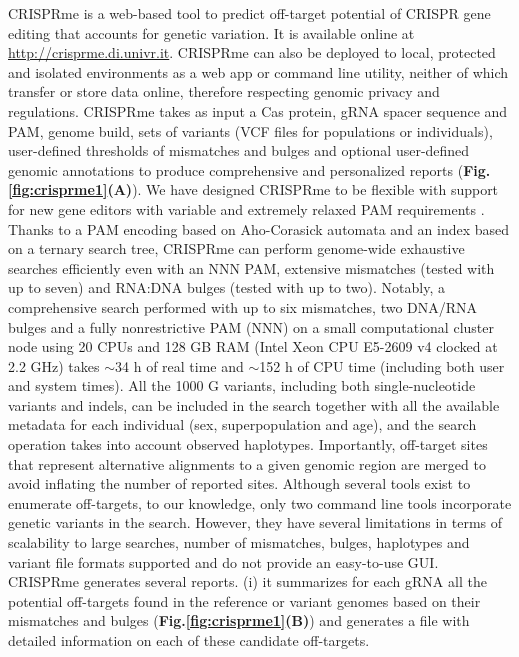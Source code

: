 \documentclass[a4paper, titlepage, openright]{book}
\newcommand{\crisprme}{CRISPRme\xspace}
\begin{document}
\crisprme is a web-based tool to predict off-target potential of CRISPR gene editing that accounts for genetic variation. It is available online at \url{http://crisprme.di.univr.it}. \crisprme can also be deployed to local, protected and isolated environments as a web app or command line utility, neither of which transfer or store data online, therefore respecting genomic privacy and regulations. \crisprme takes as input a Cas protein, gRNA spacer sequence and PAM, genome build, sets of variants (VCF files for populations or individuals), user-defined thresholds of mismatches and bulges and optional user-defined genomic annotations to produce comprehensive and personalized reports (\textbf{Fig.\ref{fig:crisprme1}(A)}). We have designed \crisprme to be flexible with support for new gene editors with variable and extremely relaxed PAM requirements \citep{walton2020unconstrained}. Thanks to a PAM encoding based on Aho-Corasick automata and an index based on a ternary search tree, CRISPRme can perform genome-wide exhaustive searches efficiently even with an NNN PAM, extensive mismatches (tested with up to seven) and RNA:DNA bulges (tested with up to two). Notably, a comprehensive search performed with up to six mismatches, two DNA/RNA bulges and a fully nonrestrictive PAM (NNN) on a small computational cluster node using 20 CPUs and 128 GB RAM (Intel Xeon CPU E5-2609 v4 clocked at 2.2 GHz) takes $\sim$34 h of real time and $\sim$152 h of CPU time (including both user and system times). All the 1000 G variants, including both single-nucleotide variants and indels, can be included in the search together with all the available metadata for each individual (sex, superpopulation and age), and the search operation takes into account observed haplotypes. Importantly, off-target sites that represent alternative alignments to a given genomic region are merged to avoid inflating the number of reported sites. Although several tools exist to enumerate off-targets, to our knowledge, only two command line tools \citep{lessard2017human, fennell2021calitas} incorporate genetic variants in the search. However, they have several limitations in terms of scalability to large searches, number of mismatches, bulges, haplotypes and variant file formats supported and do not provide an easy-to-use GUI. \crisprme generates several reports. (i) it summarizes for each gRNA all the potential off-targets found in the reference or variant genomes based on their mismatches and bulges (\textbf{Fig.\ref{fig:crisprme1}(B)}) and generates a file with detailed information on each of these candidate off-targets. 
\end{document}
